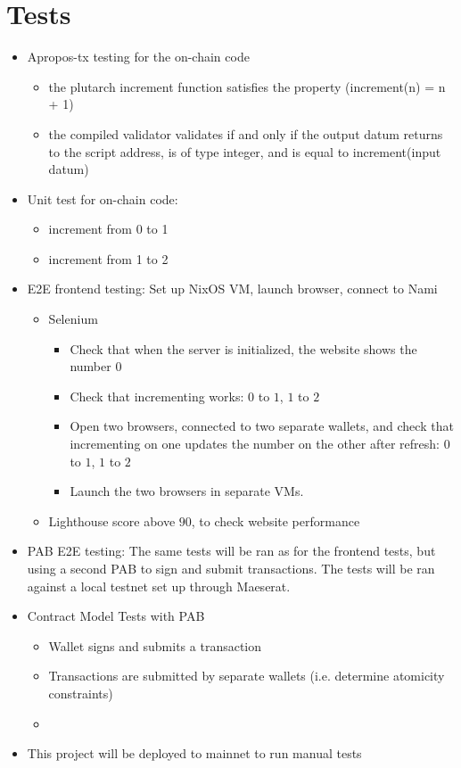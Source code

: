 \documentclass{article}
\begin{document}
\section{Tests}

\begin{itemize}
  \item Apropos-tx testing for the on-chain code
  \begin{itemize}
    \item the plutarch increment function satisfies the property (increment(n) = n + 1)
    \item the compiled validator validates if and only if the output datum returns to the script address, is of type integer, and is equal to increment(input datum)
  \end{itemize}
  \item Unit test for on-chain code:
  \begin{itemize}
    \item increment from 0 to 1
    \item increment from 1 to 2
  \end{itemize}
  \item E2E frontend testing: Set up NixOS VM, launch browser, connect to Nami
  \begin{itemize}
    \item Selenium
      \begin{itemize}
        \item Check that when the server is initialized, the website shows the
          number $0$
        \item Check that incrementing works: $0$ to $1$, $1$ to $2$
        \item Open two browsers, connected to two separate wallets, and check
          that incrementing on one updates the number on the other after
          refresh: $0$ to $1$, $1$ to $2$
        \item Launch the two browsers in separate VMs.
      \end{itemize}
    \item Lighthouse score above $90$, to check website performance
  \end{itemize}
  \item PAB E2E testing: The same tests will be ran as for the frontend tests,
    but using a second PAB to sign and submit transactions.
    The tests will be ran against a local testnet set up through Maeserat.
  \item Contract Model Tests with PAB
  \begin{itemize}
    \item Wallet signs and submits a transaction
    \item Transactions are submitted by separate wallets (i.e. determine
      atomicity constraints)
    \item {}
  \end{itemize}
  \item This project will be deployed to mainnet to run manual tests
\end{itemize}
\end{document}
